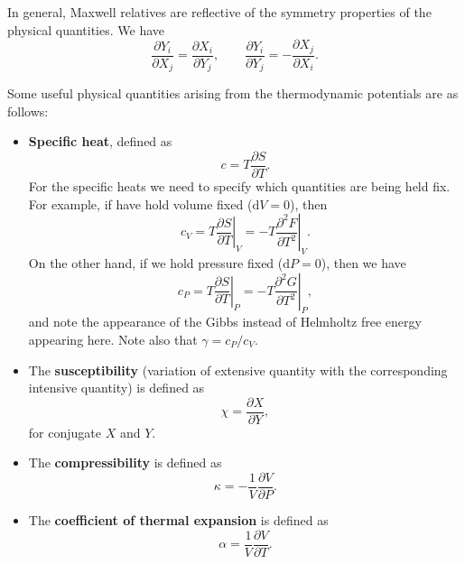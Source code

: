 \documentclass[letter-paper]{tufte-book}
\newcommand\Def[1]{\textbf{#1}}
\begin{document}
In general, Maxwell relatives are reflective of the symmetry properties of the
physical quantities. We have
\begin{equation}
  \frac{\partial Y_i}{\partial X_j} = \frac{\partial X_i}{\partial Y_j}, \qquad
  \frac{\partial Y_i}{\partial Y_j} = -\frac{\partial X_j}{\partial X_i}.
\end{equation}

Some useful physical quantities arising from the thermodynamic potentials are as
follows:
\begin{itemize}
  \item \Def{Specific heat}, defined as
  \begin{equation}
    c = T \frac{\partial S}{\partial T}.
  \end{equation}
  For the specific heats we need to specify which quantities are being held fix.
  For example, if have hold volume fixed ($\mathrm{d}V = 0$), then
  \begin{equation}
    c_V = \left. T\frac{\partial S}{\partial T}\right|_V = \left. -T\frac{\partial^2 F}{\partial T^2}\right|_V.
  \end{equation}
  On the other hand, if we hold pressure fixed ($\mathrm{d}P = 0$), then we have
  \begin{equation}
    c_P = \left. T\frac{\partial S}{\partial T}\right|_P = \left. -T\frac{\partial^2 G}{\partial T^2}\right|_P,
  \end{equation}
  and note the appearance of the Gibbs instead of Helmholtz free energy
  appearing here. Note also that $\gamma = c_P / c_V$.
  
  \item The \Def{susceptibility} (variation of extensive quantity with the
  corresponding intensive quantity) is defined as
  \begin{equation}
    \chi = \frac{\partial X}{\partial Y},
  \end{equation}
  for conjugate $X$ and $Y$.
  
  \item The \Def{compressibility} is defined as
  \begin{equation}
    \kappa = -\frac{1}{V}\frac{\partial V}{\partial P}.
  \end{equation}
  
  \item The \Def{coefficient of thermal expansion} is defined as
  \begin{equation}
    \alpha = \frac{1}{V}\frac{\partial V}{\partial T}.
  \end{equation}
\end{itemize}
\end{document}
